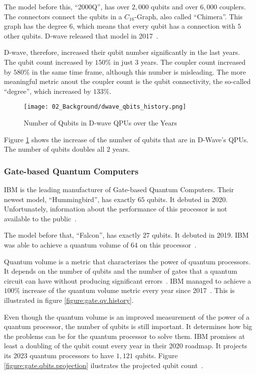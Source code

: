 The model before this, ``2000Q'', has over $2, 000$ qubits and over $6, 000$ couplers.
The connectors connect the qubits in a $C_{16}$-Graph, also called ``Chimera''.
This graph has the degree $6$, which means that every qubit has a connection with $5$ other qubits.
D-wave released that model in 2017~\cite{D-Wave2020, Zbinden2020}.

D-wave, therefore, increased their qubit number significantly in the last years.
The qubit count increased by $150\%$ in just $3$ years.
The coupler count increased by $580\%$ in the same time frame, although this number is misleading.
The more meaningful metric anout the coupler count is the qubit connectivity, the so-called ``degree'', which increased by $133\%$.

\begin{figure}[!ht]
  \centering
  \texttt{[image: 02\_Background/dwave\_qbits\_history.png]}
  \caption{Number of Qubits in D-wave QPUs over the Years \cite{D-Wave2018, D-Wave2020}}
  \label{figure:annealing.processors.history}
\end{figure}

Figure \ref{figure:annealing.processors.history} shows the increase of the number of qubits that are in D-Wave's QPUs.
The number of qubits doubles all $2$ years.

\subsubsection{Gate-based Quantum Computers}

IBM is the leading manufacturer of Gate-based Quantum Computers.
Their newest model, ``Hummingbird'', has exactly $65$ qubits.
It debuted in 2020.
Unfortunately, information about the performance of this processor is not available to the public~\cite{IBMRoadmap2020}.

The model before that, ``Falcon'', has exactly $27$ qubits.
It debuted in 2019.
IBM was able to achieve a quantum volume of $64$ on this processor~\cite{IBMRoadmap2020}.

Quantum volume is a metric that characterizes the power of quantum processors.
It depends on the number of qubits and the number of gates that a quantum circuit can have without producing significant errors~\cite{Bishop2017}.
IBM managed to achieve a $100\%$ increase of the quantum volume metric every year since 2017~\cite{IBMqv2020}.
This is illustrated in figure \ref{figure:gate.qv.history}.

Even though the quantum volume is an improved measurement of the power of a quantum processor, the number of qubits is still important.
It determines how big the problems can be for the quantum processor to solve them.
IBM promises at least a doubling of the qubit count every year in their 2020 roadmap.
It projects its 2023 quantum processors to have $1, 121$ qubits.
Figure \ref{figure:gate.qbits.projection} ilustrates the projected qubit count~\cite{IBMRoadmap2020}.

